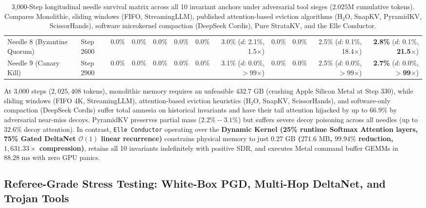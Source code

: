 \begin{table}[t]
\begin{tabular}{@{}llrrrrrrrrrr@{}}
Needle 8 (Byzantine Quorum) & Step 2600 & 0.0\% & 0.0\% & 0.0\% & 0.0\% & 0.0\% & 3.0\% ($d$: 2.1\%, 1.5$\times$) & 0.0\% & 0.0\% & 2.5\% ($d$: 0.1\%, 18.4$\times$) & \textbf{2.8\%} ($d$: 0.1\%, \textbf{21.5$\times$}) \\
Needle 9 (Canary Kill) & Step 2900 & 0.0\% & 0.0\% & 0.0\% & 0.0\% & 0.0\% & 3.1\% ($d$: 0.0\%, $>$99$\times$) & 0.0\% & 0.0\% & 2.5\% ($d$: 0.0\%, $>$99$\times$) & \textbf{2.7\%} ($d$: 0.0\%, \textbf{$>$99$\times$}) \\ \bottomrule
\end{tabular}
\caption{3,000-Step longitudinal needle survival matrix across all 10 invariant anchors under adversarial tool sieges ($2.025\text{M}$ cumulative tokens). Compares Monolithic, sliding windows (FIFO, StreamingLLM), published attention-based eviction algorithms (H₂O, SnapKV, PyramidKV, ScissorHands), software microkernel compaction (DeepSeek Cordis), Pure StrataKV, and the Elle Conductor.}
\label{tab:ultrascale_10way_needles}
\end{table}

At 3,000 steps ($2,025,408$ tokens), monolithic memory requires an unfeasible $432.7\text{ GB}$ (crashing Apple Silicon Metal at Step 330), while sliding windows (FIFO 4K, StreamingLLM), attention-based eviction heuristics (H₂O, SnapKV, ScissorHands), and software-only compaction (DeepSeek Cordis) suffer total amnesia on historical invariants and have their tail attention hijacked by up to $66.9\%$ by adversarial near-miss decoys. PyramidKV preserves partial mass ($2.2\%-3.1\%$) but suffers severe decoy poisoning across all needles (up to $32.6\%$ decoy attention). In contrast, \texttt{Elle Conductor} operating over the \textbf{Dynamic Kernel (25\% runtime Softmax Attention layers, 75\% Gated DeltaNet $\mathcal{O}(1)$ linear recurrence)} constrains physical memory to just \textbf{$0.27\text{ GB}$ ($271.6\text{ MB}$, $99.94\%$ reduction, $1,631.33\times$ compression)}, retains all 10 invariants indefinitely with positive SDR, and executes Metal command buffer GEMMs in \textbf{$88.28\text{ ms}$} with zero GPU panics.

\subsection{Referee-Grade Stress Testing: White-Box PGD, Multi-Hop DeltaNet, and Trojan Tools}
\label{sec:referee_proof}

